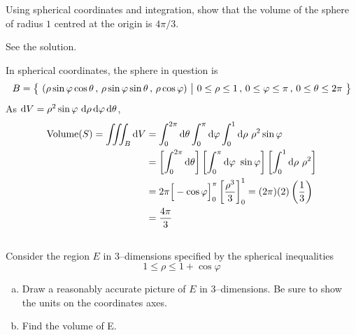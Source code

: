 \begin{question}[M200 2008A] %
Using spherical coordinates and integration, show that the volume of
the sphere of radius $1$ centred at the origin is $4\pi/3$.
\end{question}

%

\begin{answer}
See the solution.
\end{answer}

\begin{solution}
In spherical coordinates, the sphere in question is
\begin{align*}
B =\big\{ \ (\rho\sin\varphi\cos\theta\,,\,\rho\sin\varphi\sin\theta\,,\,
          \rho\cos\varphi)\ \big|\ 0\le\rho\le 1\,,\,0\le\varphi\le\pi\,,\,
          0\le\theta\le 2\pi\ \big\}
\end{align*}
As $\mathrm{d}V =\rho^2\sin\varphi\ \mathrm{d}\rho\,\mathrm{d}\varphi\,\mathrm{d}\theta$,
\begin{align*}
\text{Volume}(S)
=\tripInt_B\dee{V}
&=\int_0^{2\pi}\dee{\theta}\int_0^{\pi}\dee{\varphi}\int_0^1\dee{\rho}\ 
         \rho^2\sin\varphi \\
&=\left[\int_0^{2\pi}\dee{\theta}\right]
  \left[\int_0^{\pi}\dee{\varphi}\ \sin\varphi\right]
  \left[\int_0^1\dee{\rho}\ \rho^2\right] \\
&= 2\pi\Big[-\cos\varphi\Big]_0^\pi \left[\frac{\rho^3}{3}\right]_0^1 
 =(2\pi)(2)\left(\frac{1}{3}\right) \\
&=\frac{4\pi}{3}
\end{align*}
\end{solution}


\subsection*{\Procedural}

\begin{question}[M200 2006A] %
Consider the region $E$ in $3$--dimensions specified by the 
spherical inequalities 
\begin{equation*}
1 \le \rho \le 1 + \cos \varphi
\end{equation*}
\begin{enumerate}[(a)]
\item
  Draw a reasonably accurate picture of $E$ in 3--dimensions. 
Be sure to show the units on the coordinates axes. 

\item
  Find the volume of E. 
\end{enumerate}
\end{question}

